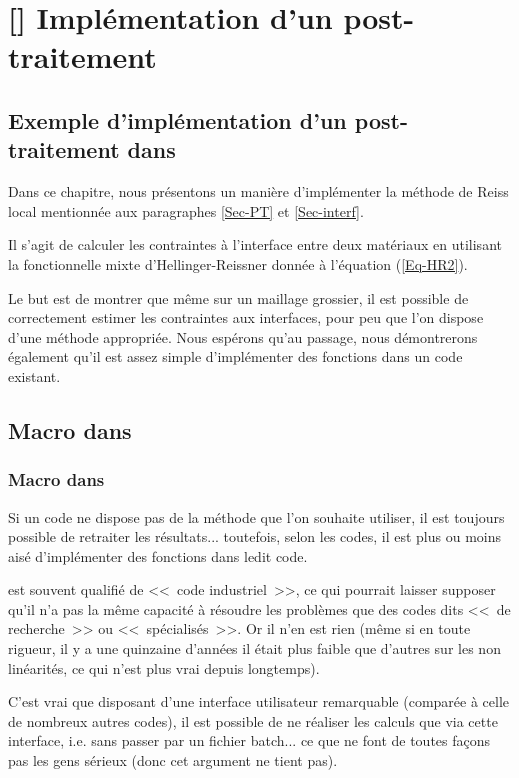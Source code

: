 \ifVersionAvecExemplesSepares
   \chapter{[\ansys] Implémentation d'un post-traitement}
\else
   \section{Exemple d'implémentation d'un post-traitement dans \ansys}
\fi

Dans ce chapitre, nous présentons un manière d'implémenter la méthode de Reiss local mentionnée aux
paragraphes \ref{Sec-PT} et \ref{Sec-interf}.

Il s'agit de calculer les contraintes à l'interface entre deux matériaux en utilisant la fonctionnelle mixte d'Hellinger-Reissner
donnée à l'équation (\ref{Eq-HR2}).

\medskip
Le but est de montrer que même sur un maillage grossier, il est possible de correctement estimer les contraintes
aux interfaces, pour peu que l'on dispose d'une méthode appropriée. Nous espérons qu'au passage, nous
démontrerons également qu'il est assez simple d'implémenter des fonctions dans un code existant.





\medskip
\ifVersionAvecExemplesSepares
   \section{Macro dans \ansys}
\else
   \subsection{Macro dans \ansys}
\fi

Si un code ne dispose pas de la méthode que l'on souhaite utiliser, il est toujours possible de retraiter les
résultats... toutefois, selon les codes, il est plus ou moins aisé d'implémenter des fonctions dans ledit code.

\medskip
\ansys est souvent qualifié de <<~code industriel~>>, ce qui pourrait laisser supposer qu'il n'a pas la même capacité
à résoudre les problèmes que des codes dits <<~de recherche~>> ou <<~spécialisés~>>.
Or il n'en est rien (même si en toute rigueur, il y a une quinzaine d'années il était plus faible que d'autres sur
les non linéarités, ce qui n'est plus vrai depuis longtemps).

C'est vrai que disposant d'une interface utilisateur remarquable (comparée à celle de nombreux autres codes),
il est possible de ne réaliser les calculs que via cette interface, i.e. sans passer par un fichier batch... ce que ne
font de toutes façons pas les gens sérieux (donc cet argument ne tient pas).

